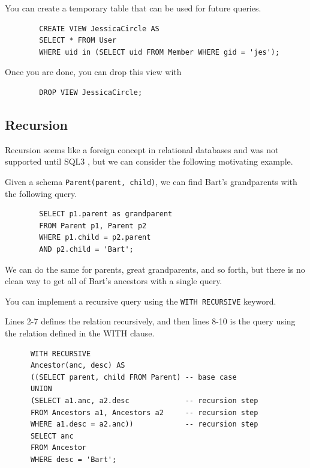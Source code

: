     \begin{example}
      \label{ex:jessicas-circle}
      You can create a temporary table that can be used for future queries. 
      \begin{lstlisting}
        CREATE VIEW JessicaCircle AS 
        SELECT * FROM User 
        WHERE uid in (SELECT uid FROM Member WHERE gid = 'jes'); 
      \end{lstlisting}
      Once you are done, you can drop this view with 
      \begin{lstlisting}
        DROP VIEW JessicaCircle; 
      \end{lstlisting}
    \end{example}

\subsection{Recursion} 

  Recursion seems like a foreign concept in relational databases and was not supported until SQL3 , but we can consider the following motivating example. 

  \begin{example}[Ancestors]
    \label{ex:ancestors}
    Given a schema \texttt{Parent(parent, child)}, we can find Bart's grandparents with the following query. 
      \begin{lstlisting}
        SELECT p1.parent as grandparent 
        FROM Parent p1, Parent p2 
        WHERE p1.child = p2.parent 
        AND p2.child = 'Bart';
      \end{lstlisting}
      We can do the same for parents, great grandparents, and so forth, but there is no clean way to get all of Bart's ancestors with a single query.  
  \end{example} 

  \begin{definition}[Recursion]
    \label{def:recursion}
    You can implement a recursive query using the \texttt{WITH RECURSIVE} keyword. 
  \end{definition}

  \begin{example}
    \label{ex:recursive-query-for-ancestors}
    Lines 2-7 defines the relation recursively, and then lines 8-10 is the query using the relation defined in the WITH clause. 
    \begin{lstlisting}
      WITH RECURSIVE 
      Ancestor(anc, desc) AS 
      ((SELECT parent, child FROM Parent) -- base case
      UNION 
      (SELECT a1.anc, a2.desc             -- recursion step
      FROM Ancestors a1, Ancestors a2     -- recursion step
      WHERE a1.desc = a2.anc))            -- recursion step
      SELECT anc 
      FROM Ancestor 
      WHERE desc = 'Bart'; 
    \end{lstlisting}
  \end{example}

